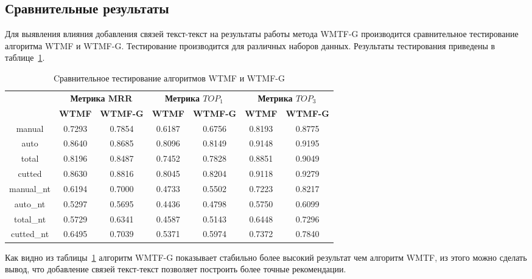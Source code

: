 \subsection{Сравнительные результаты}
    Для выявления влияния добавления связей текст-текст на результаты работы метода WMTF-G производится сравнительное тестирование алгоритма WTMF и WTMF-G. Тестирование производится для различных наборов данных.
    Результаты тестирования приведены в таблице~\ref{tabular:wtmf_wmtfg}.

    \begin{table}[h!]
    \caption{Cравнительное тестирование алгоритмов WTMF и WTMF-G \bigskip}
    \centering

    \label{tabular:wtmf_wmtfg}
        \begin{tabular}{|c|c|c|c|c|c|c|}
            \hline
            \bf{\multirow{2}{*}{\specialcell{Набор данных}}} &
            \multicolumn{2}{|c|}{\bf{Метрика MRR}} &
            \multicolumn{2}{|c|}{\bf{Метрика $TOP_1$}} &
            \multicolumn{2}{|c|}{\bf{Метрика $TOP_3$}} \\ \cline{2-7}
            & \bf{WTMF} & \bf{WTMF-G} & \bf{WTMF} & \bf{WTMF-G} & \bf{WTMF} & \bf{WTMF-G} \\ \hline
            manual     & 0.7293 & 0.7854 & 0.6187 & 0.6756 & 0.8193 & 0.8775 \\ \hline
            auto       & 0.8640 & 0.8685 & 0.8096 & 0.8149 & 0.9148 & 0.9195 \\ \hline
            total      & 0.8196 & 0.8487 & 0.7452 & 0.7828 & 0.8851 & 0.9049 \\ \hline
            cutted     & 0.8630 & 0.8816 & 0.8045 & 0.8204 & 0.9118 & 0.9279 \\ \hline
            manual\_nt & 0.6194 & 0.7000 & 0.4733 & 0.5502 & 0.7223 & 0.8217 \\ \hline
            auto\_nt   & 0.5297 & 0.5695 & 0.4436 & 0.4798 & 0.5750 & 0.6099 \\ \hline
            total\_nt  & 0.5729 & 0.6341 & 0.4587 & 0.5143 & 0.6448 & 0.7296 \\ \hline
            cutted\_nt & 0.6495 & 0.7039 & 0.5371 & 0.5974 & 0.7372 & 0.7840 \\ \hline
        \end{tabular}
    \end{table}

    Как видно из таблицы~\ref{tabular:wtmf_wmtfg} алгоритм WMTF-G показывает стабильно более высокий результат чем алгоритм WMTF,
    из этого можно сделать вывод, что добавление связей текст-текст позволяет построить более точные рекомендации.

